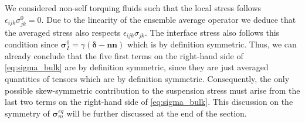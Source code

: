 We considered non-self torquing fluids such that the local stress follows  $\epsilon_{ijk} \sigma_{jk}^0 = 0$. 
Due to the linearity of the ensemble average operator we deduce that the averaged stress also respects $\epsilon_{ijk} \sigma_{jk}$.
The interface stress also follows this condition since $\bm\sigma_I^0 = \gamma (\bm\delta - \textbf{nn})$ which is by definition symmetric.  
Thus, we can already conclude that the five first terms on the right-hand side of \ref{eq:sigma_bulk} are by definition symmetric, since they are just averaged quantities of tensors which are by definition symmetric. 
Consequently, the only possible skew-symmetric contribution to the suspension stress must arise from the last two terms on the right-hand side of \ref{eq:sigma_bulk}.  
This discussion on the symmetry of $\bm\sigma^{eq}_m$ will be further discussed at the end of the section. 



